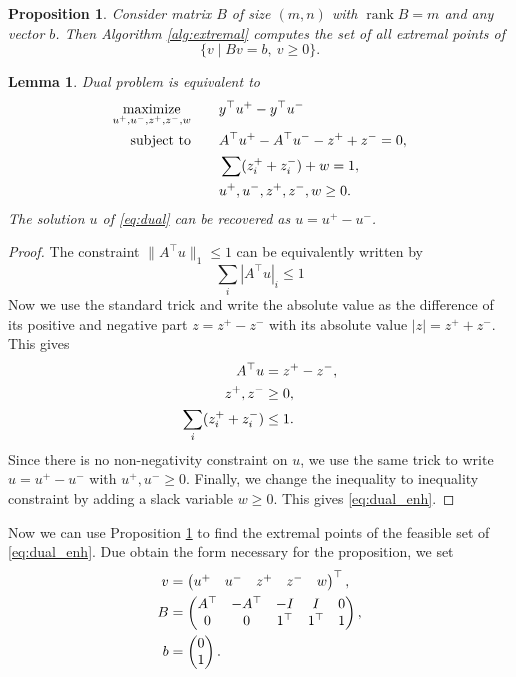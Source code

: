 \documentclass{article}
\newcommand{\mxmz}{\operatorname*{maximize}}
\newcommand{\st}{\operatorname{subject\ to}}
\newcommand{\norm}[1]{\|#1\|}
\newcommand{\nrm}[1]{|#1|}
\newtheorem{lemma}[thm]{Lemma}
\newtheorem{proposition}[thm]{Proposition}
\theoremstyle{definition}
\newcommand{\rank}{\operatorname{rank}}
\begin{document}
\begin{proposition}\label{prop:extremal}
  Consider matrix $B$ of size $(m,n)$ with $\rank B=m$ and any vector $b$. Then Algorithm \ref{alg:extremal} computes the set of all extremal points of
  \begin{equation}\label{eq:extremal_set}
    \{v\mid Bv=b,\ v\ge 0\}.
  \end{equation}
\end{proposition}




\begin{lemma}\label{lemma:dual_enh}
Dual problem is equivalent to
\begin{equation}\label{eq:dual_enh}
  \aligned
  \mxmz_{u^+,u^-,z^+,z^-,w}\qquad &y^\top u^+ - y^\top u^-  \\
  \st\qquad &A^\top u^+ - A^\top u^- - z^+ + z^- = 0, \\
  &\sum(z_i^+ + z_i^-) + w = 1, \\
  &u^+,u^-,z^+,z^-,w \ge0.
  \endaligned
\end{equation}
The solution $u$ of \eqref{eq:dual} can be recovered as $u = u^+ - u^-$.
\end{lemma}
\begin{proof}
  The constraint $\norm{A^\top u}_1 \le 1$ can be equivalently written by
  $$
    \sum_i \nrm{A^\top u}_i \le 1
  $$
  Now we use the standard trick and write the absolute value as the difference of its positive and negative part $z=z^+-z^-$ with its absolute value $\nrm{z}=z^++z^-$. This gives
  $$
    \aligned
    A^\top u &= z^+ - z^-, \\
    z^+, z^- &\ge 0, \\
    \sum_i (z_i^+ + z_i^-) &\le 1.
    \endaligned
  $$
  Since there is no non-negativity constraint on $u$, we use the same trick to write $u=u^+-u^-$ with $u^+,u^-\ge 0$. Finally, we change the inequality to inequality constraint by adding a slack variable $w\ge 0$. This gives \eqref{eq:dual_enh}.
\end{proof}

Now we can use Proposition \ref{prop:extremal} to find the extremal points of the feasible set of \eqref{eq:dual_enh}. Due obtain the form necessary for the proposition, we set
\begin{equation}\label{eq:enh_matrices}
  \aligned
  v &= \begin{pmatrix} u^+ & u^- & z^+& z^- & w \end{pmatrix}^\top, \\
  B &= \begin{pmatrix} A^\top & -A^\top & -I & I & 0 \\ 0 & 0 & 1^\top & 1^\top & 1 \end{pmatrix}, \\
  b &= \begin{pmatrix}0\\1 \end{pmatrix}.
  \endaligned
\end{equation}
\end{document}
